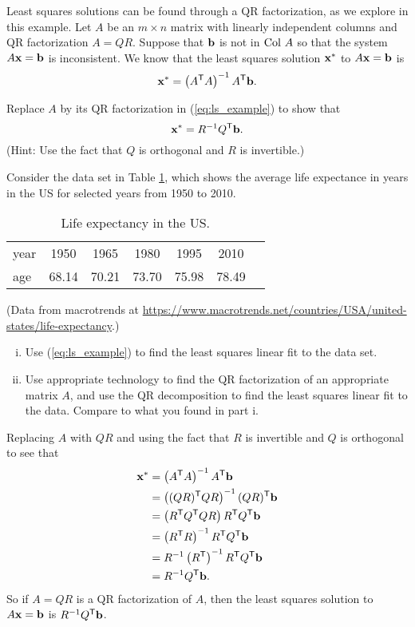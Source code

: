 \begin{example} Least squares solutions can be found through a QR factorization, as we explore in this example. Let $A$ be an $m \times n$ matrix with linearly independent columns and QR factorization $A = QR$. Suppose that $\mathbf{b}$ is not in $\text{Col } A$ so that the system $A \mathbf{x} = \mathbf{b}$ is inconsistent. We know that the least squares solution $\mathbf{x}^*$ to $A \mathbf{x} = \mathbf{b}$ is 
\begin{equation} \label{eq:ls_example}
\mathbf{x}^* = \left(A^{\mathsf{T}}A\right)^{-1}A^{\mathsf{T}}\mathbf{b}.
\end{equation}
\ba
\item Replace $A$ by its QR factorization in (\ref{eq:ls_example}) to show that 
\[\mathbf{x}^* = R^{-1}Q^{\mathsf{T}} \mathbf{b}.\]
(Hint: Use the fact that $Q$ is orthogonal and $R$ is invertible.)

\item Consider the data set in Table \ref{T:life_exectancy}, which shows the average life expectance in years in the US for selected years from 1950 to 2010. 
\begin{table}[ht]
\begin{center}
\begin{tabular}{l|cccccc}
year	&1950 	&1965 	&1980 	&1995 	&2010 \\
age	&68.14	&70.21	&73.70	&75.98	&78.49 
\end{tabular}
\caption{Life expectancy in the US.}
\label{T:life_exectancy}
\end{center}
\end{table}
(Data from macrotrends at \url{https://www.macrotrends.net/countries/USA/united-states/life-expectancy}.) 
	\begin{enumerate}[i.]
	\item Use (\ref{eq:ls_example}) to find the least squares linear fit to the data set. 
	
	\item Use appropriate technology to find the QR factorization of an appropriate matrix $A$, and use the QR decomposition to find the least squares linear fit to the data. Compare to what you found in part i. 

	\end{enumerate}
	
\ea

\end{example}

\ExampleSolution
\ba
\item Replacing $A$ with $QR$ and using the fact that $R$ is invertible and $Q$ is orthogonal to see that 
\begin{align*}
\mathbf{x}^* &= \left(A^{\mathsf{T}}A\right)^{-1}A^{\mathsf{T}}\mathbf{b} \\
	 &= \left((QR)^{\mathsf{T}}QR\right)^{-1} (QR)^{\mathsf{T}} \mathbf{b} \\
	&= \left(R^{\mathsf{T}}Q^{\mathsf{T}}QR\right) R^{\mathsf{T}}Q^{\mathsf{T}} \mathbf{b} \\
	&= \left(R^{\mathsf{T}}R\right)^{-1}R^{\mathsf{T}}Q^{\mathsf{T}} \mathbf{b} \\
	&= R^{-1}\left(R^{\mathsf{T}}\right)^{-1}R^{\mathsf{T}} Q^{\mathsf{T}} \mathbf{b} \\
	&= R^{-1}Q^{\mathsf{T}} \mathbf{b}.
\end{align*}
So if $A = QR$ is a QR factorization of $A$, then the least squares solution to $A \mathbf{x} = \mathbf{b}$ is $R^{-1}Q^{\mathsf{T}} \mathbf{b}$. 

